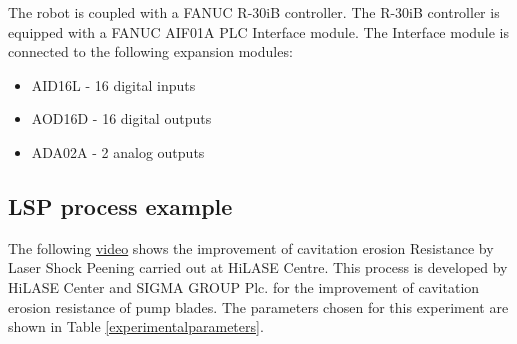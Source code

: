 The robot is coupled with a FANUC R-30iB controller. The R-30iB controller is equipped with a FANUC AIF01A PLC Interface module. The Interface module is connected to the following expansion modules:

\begin{itemize}
    \item AID16L - 16 digital inputs
    \item AOD16D - 16 digital outputs
    \item ADA02A - 2 analog outputs \cite{fanucunitmanual}
\end{itemize}

\subsection{LSP process example}

The following \href{https://www.youtube.com/watch?v=awhlLU91-dk&ab_channel=HiLASECentre}{video} shows the improvement of cavitation erosion Resistance by Laser Shock Peening carried out at HiLASE Centre. This process is developed by HiLASE Center and SIGMA GROUP Plc. for the improvement of cavitation erosion resistance of pump blades. The parameters chosen for this experiment are shown in Table \ref{experimentalparameters}. 

